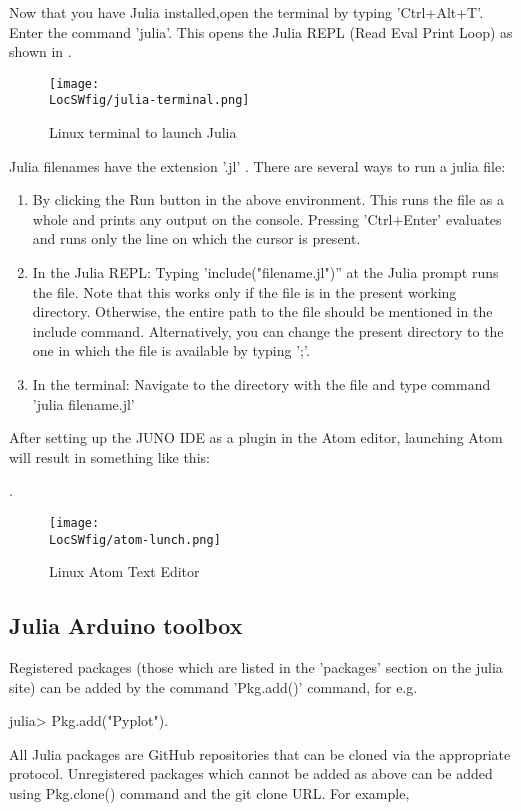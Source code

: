 Now that you have Julia installed,open the terminal by typing 'Ctrl+Alt+T'.
Enter the command 'julia'. This opens the Julia REPL (Read Eval Print Loop)
as shown in
.
\begin{figure}
      \centering
      \texttt{[image: \\LocSWfig/julia-terminal.png]}
      \caption{Linux terminal to launch Julia}
      \label{julia-terminal}
\end{figure}

Julia filenames have the extension '.jl' . There are several ways to run a julia file:

\begin{enumerate}
      \item By clicking the Run button in the above environment. This runs the file as a whole and prints any output on the console. Pressing 'Ctrl$+$Enter' evaluates and runs only the line on which the cursor is present.
      \item In the Julia REPL: Typing 'include("filename.jl")'' at the Julia prompt runs the file. Note that this works only if the file is in the present working directory. Otherwise, the entire path to the file should be mentioned in the include command. Alternatively, you can change the present directory to the one in which the file is available by typing ';'.
      \item In the terminal: Navigate to the directory with the file and type command 'julia filename.jl'
\end{enumerate}


After setting up the JUNO IDE as a plugin in the Atom editor, launching Atom will result in something like this:

.
\begin{figure}
      \centering
      \texttt{[image: \\LocSWfig/atom-lunch.png]}
      \caption{Linux Atom Text Editor}
      \label{atom-lunch}
\end{figure}

\subsection{Julia Arduino toolbox}
Registered packages (those which are listed in the 'packages' section on the julia site) can be added by the command 'Pkg.add()' command, for e.g.

julia> Pkg.add("Pyplot").

All Julia packages are GitHub repositories that can be cloned via the appropriate protocol. Unregistered packages which cannot be added as above can be added using Pkg.clone() command and the git clone URL. For example,

